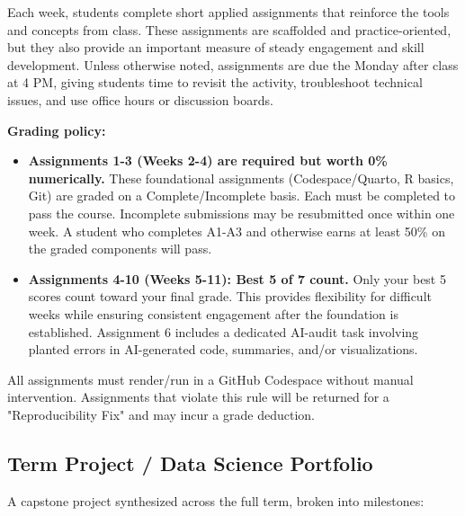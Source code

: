 \documentclass[
  letterpaper,
  DIV=11,
  numbers=noendperiod,
  oneside]{scrreprt}
\providecommand{\tightlist}{%
  \setlength{\itemsep}{0pt}\setlength{\parskip}{0pt}}
\begin{document}
Each week, students complete short applied assignments that reinforce
the tools and concepts from class. These assignments are scaffolded and
practice-oriented, but they also provide an important measure of steady
engagement and skill development. Unless otherwise noted, assignments
are due the Monday after class at 4 PM, giving students time to revisit
the activity, troubleshoot technical issues, and use office hours or
discussion boards.

\textbf{Grading policy:}

\begin{itemize}
\tightlist
\item
  \textbf{Assignments 1-3 (Weeks 2-4) are required but worth 0\%
  numerically.} These foundational assignments (Codespace/Quarto, R
  basics, Git) are graded on a Complete/Incomplete basis. Each must be
  completed to pass the course. Incomplete submissions may be
  resubmitted once within one week. A student who completes A1-A3 and
  otherwise earns at least 50\% on the graded components will pass.
\item
  \textbf{Assignments 4-10 (Weeks 5-11): Best 5 of 7 count.} Only your
  best 5 scores count toward your final grade. This provides flexibility
  for difficult weeks while ensuring consistent engagement after the
  foundation is established. Assignment 6 includes a dedicated AI-audit
  task involving planted errors in AI-generated code, summaries, and/or
  visualizations.
\end{itemize}

\begin{tcolorbox}[colback=brandlight!5!white, colframe=brandblue, title=\textbf{Reproducibility requirement}, arc=2mm]
All assignments must render/run in a GitHub Codespace without manual intervention. Assignments that violate this rule will be returned for a "Reproducibility Fix" and may incur a grade deduction.
\end{tcolorbox}

\subsection{Term Project / Data Science
Portfolio}\label{term-project-data-science-portfolio}

A capstone project synthesized across the full term, broken into
milestones:
\end{document}
